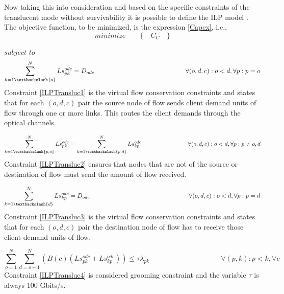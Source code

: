 Now taking this into consideration and based on the specific constraints of the translucent mode without survivability it is possible to define the ILP model \cite{zhu_transl} \cite{zhu_transl2}.\\

The objective function, to be minimized, is the expression \ref{Capex}, i.e.,
\begin{equation*}
  minimize \qquad \Big\{ \quad C_C \quad \Big\}
\end{equation*}

$subject$ $to$
\begin{equation}
\sum_{k=1\textbackslash \{o\}}^{N} Ls_{pk}^{odc} = D_{odc} \qquad \qquad \qquad \qquad \qquad \qquad \qquad
\forall(o,d,c) : o < d, \forall p: p = o
\label{ILPTransluc1}
\end{equation}
\noindent
Constraint \ref{ILPTransluc1} is the virtual flow conservation constraints and states that for each $(o,d,c)$ pair the source node of flow sends client demand units of flow through one or more links. This routes the client demands through the optical channels.

\begin{equation}
\sum_{k=1\textbackslash \{p,o\}}^{N} Ls_{pk}^{odc} = \sum_{k=1\textbackslash \{p,d\}}^{N} Ls_{kp}^{odc} \qquad \qquad \qquad \qquad
\forall(o,d,c) : o < d, \forall p: p \neq o,d
\label{ILPTransluc2}
\end{equation}
\noindent
Constraint \ref{ILPTransluc2} ensures that nodes that are not of the source or destination of flow must send the amount of flow received.

\begin{equation}
\sum_{k=1\textbackslash \{d\}}^{N} Ls_{kp}^{odc} = D_{odc} \qquad \qquad \qquad \qquad \qquad \qquad \qquad \qquad
\forall(o,d,c) : o < d, \forall p: p = d
\label{ILPTransluc3}
\end{equation}
\noindent
Constraint \ref{ILPTransluc3} is the virtual flow conservation constraints and states that for each $(o,d,c)$ pair the destination node of flow has to receive those client demand units of flow.

\begin{equation}
\sum_{o=1}^{N} \sum_{d=o+1}^{N} (B(c)(Ls_{pk}^{odc} + Ls_{kp}^{odc})) \leq  \tau \lambda_{pk} \qquad \qquad \qquad \qquad \qquad
\forall (p,k) : p < k, \forall c
\label{ILPTransluc4}
\end{equation}
\noindent
Constraint \ref{ILPTransluc4} is considered grooming constraint and the variable $\tau$ is always 100 Gbits/s.


